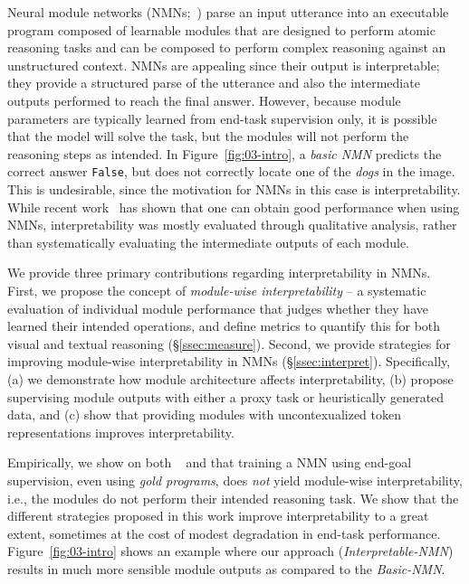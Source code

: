 \documentclass[main.tex]{subfiles}
\begin{document}
Neural module networks (NMNs;~) parse an input utterance into an executable program composed of learnable modules that are designed to perform atomic reasoning tasks and can be composed to perform complex reasoning against an unstructured context. NMNs are appealing since their output is interpretable; they provide a structured parse of the utterance and also the intermediate outputs performed to reach the final answer.
However, because module parameters are typically learned from end-task supervision only, it is possible that the model will solve the task, but the modules will not perform the reasoning steps as intended. In Figure~\ref{fig:03-intro}, a \emph{basic NMN} predicts the correct answer \texttt{False}, but does not correctly locate one of the \emph{dogs} in the image. This is undesirable, since the motivation for NMNs in this case is interpretability.
While recent work~\cite{explainablenmn-hu-2018,jiang-nmn-2019} has shown that one can obtain good performance when using NMNs, interpretability was mostly evaluated through qualitative analysis, rather than systematically evaluating the intermediate outputs of each module.

We provide three primary contributions regarding interpretability in NMNs.
First, we propose the concept of \emph{module-wise interpretability} -- a systematic evaluation of individual module performance that judges whether they have learned their intended operations, and define metrics to quantify this for both visual and textual reasoning (\S\ref{ssec:measure}).
Second, we provide strategies for improving module-wise interpretability in NMNs (\S\ref{ssec:interpret}).
Specifically, (a) we demonstrate how module architecture affects interpretability,
(b) propose supervising module outputs with either a proxy task or heuristically generated data, and (c)
show that providing modules with uncontexualized token representations improves interpretability.

Empirically, we show on both \nlvr{}~\cite{nlvr2-suhr-2018} and \drop{} \cite{drop-2019} that training a NMN using end-goal supervision, even using \emph{gold programs}, does \emph{not} yield module-wise interpretability, i.e., the modules do not perform their intended reasoning task.
We show that the different strategies proposed in this work improve interpretability to a great extent, sometimes at the cost of modest degradation in end-task performance.
Figure~\ref{fig:03-intro} shows an example where our approach (\emph{Interpretable-NMN})
results in much more sensible module outputs as compared to the \emph{Basic-NMN}.
\end{document}
